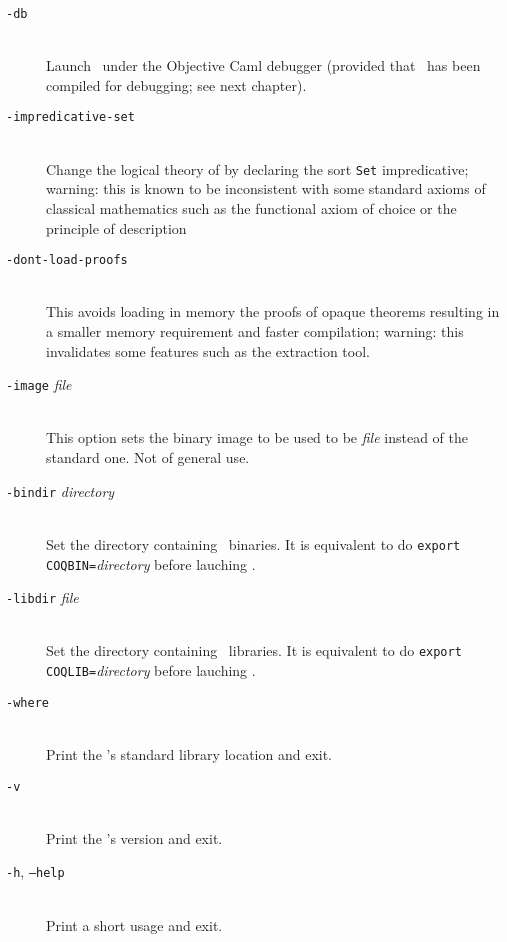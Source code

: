 \begin{description}
\item[{\tt -db}]\ \\
  Launch \Coq\ under the Objective Caml debugger (provided that \Coq\
  has been compiled for debugging; see next chapter).

\item[{\tt -impredicative-set}]\ \\
  Change the logical theory of {\Coq} by declaring the sort {\tt Set}
  impredicative; warning: this is known to be inconsistent with
  some standard axioms of classical mathematics such as the functional
  axiom of choice or the principle of description\\

\item[{\tt -dont-load-proofs}]\ \\
  This avoids loading in memory the proofs of opaque theorems
  resulting in a smaller memory requirement and faster compilation;
  warning: this invalidates some features such as the extraction tool.

\item[{\tt -image} {\em file}]\ \\
  This option sets the binary image to be used to be {\em file}
  instead of the standard one. Not of general use.

\item[{\tt -bindir} {\em directory}]\ \\
  Set the directory containing \Coq\ binaries.
  It is equivalent to do \texttt{export COQBIN=}{\em directory}
  before lauching \Coq.

\item[{\tt -libdir} {\em file}]\ \\
  Set the directory containing \Coq\ libraries.
  It is equivalent to do \texttt{export COQLIB=}{\em directory}
  before lauching \Coq.

\item[{\tt -where}]\ \\
  Print the \Coq's standard library location and exit.

\item[{\tt -v}]\ \\
  Print the \Coq's version and exit.

\item[{\tt -h}, {\tt --help}]\ \\
  Print a short usage and exit.
\end{description}





